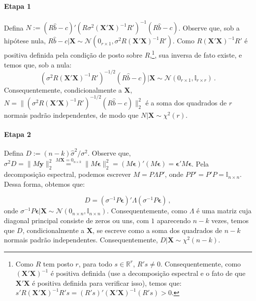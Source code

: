 \documentclass[12pt,a4paper]{article}
\begin{document}
\paragraph{Etapa 1} Defina $N := (R\hat{b}-c)'\left(R\sigma^2(\boldsymbol{X}'\boldsymbol{X})^{-1}R'\right)^{-1}(R\hat{b}-c) $. Observe que, sob a hipótese nula, $R\hat{b}-c|\boldsymbol{X}\sim \mathcal{N}(0_{r \times 1}, \sigma^2 R(\mathbf{X}'\mathbf{X})^{-1}R')$. Como $R(\mathbf{X}'\mathbf{X})^{-1}R'$ é positiva definida pela condição de posto sobre $R$,\footnote{Como $R$ tem posto $r$, para todo $s \in \mathbb{R}^r$, $R's\neq 0$. Consequentemente, como $(\mathbf{X}'\mathbf{X})^{-1}$ é positiva definida (use a decomposição espectral e o fato de que $\mathbf{X}'\mathbf{X}$ é positiva definida para verificar isso), temos que: $s' R(\mathbf{X}'\mathbf{X})^{-1}R's=(R's)'(\mathbf{X}'\mathbf{X})^{-1}(R's) > 0$.}, sua inversa de fato existe, e temos que, sob a nula:
$$(\sigma^2 R(\mathbf{X}'\mathbf{X})^{-1}R')^{-1/2}(R\hat{b}-c) |\boldsymbol{X}\sim \mathcal{N}(0_{r\times1},\mathbb{I}_{r\times r})\, .$$
Consequentemente, condicionalmente a $\mathbf{X}$, $N = \lVert (\sigma^2 R(\mathbf{X}'\mathbf{X})^{-1}R')^{-1/2}(R\hat{b}-c) \rVert_2^2$ é a soma dos quadrados de $r$ normais padrão independentes, de modo que $N|\mathbf{X}\sim \chi^2(r)$.

\paragraph{Etapa 2} Defina $D:=(n-k)\hat{\sigma}^2/\sigma^2$. Observe que, $\sigma^2D = \lVert M\boldsymbol{y} \rVert_2^2 \overset{M\boldsymbol{X}=0_{n\times k}}{=} \lVert M\boldsymbol{\epsilon} \rVert_2^2= (M\boldsymbol{\epsilon})'(M\boldsymbol{\epsilon}) = \boldsymbol{\epsilon}'M\boldsymbol{\epsilon}$. Pela decomposição espectral, podemos escrever $M = P \Lambda P'$, onde $PP'=P'P=\mathbb{I}_{n\times n}$. Dessa forma, obtemos que:

$$D = \left(\sigma^{-1}P\boldsymbol{\epsilon}\right)'\Lambda \left(\sigma^{-1}P\boldsymbol{\epsilon}\right)\, ,$$
onde $\sigma^{-1}P\boldsymbol{\epsilon}|\boldsymbol{X}\sim \mathcal{N}(0_{n\times n}, \mathbb{I}_{n\times n})$. Consequentemente, como $\Lambda$ é uma matriz cuja diagonal principal consiste de zeros ou uns, com $1$ aparecendo $n-k$ vezes, temos que $D$, condicionalmente a $\boldsymbol{X}$, se escreve como a soma dos quadrados de $n-k$ normais padrão independentes. Consequentemente, $D|\boldsymbol{X}\sim \chi^2(n-k)$.
\end{document}
